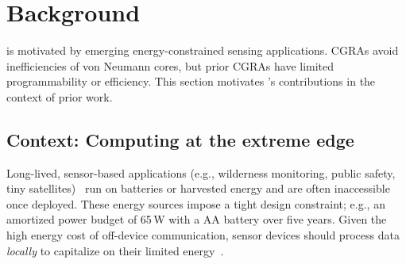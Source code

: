 \section{Background}
\label{riptide:background}

\tabRipTideSnippets

\riptide is motivated by emerging energy-constrained sensing applications.
%
CGRAs avoid inefficiencies of von Neumann cores,
but prior CGRAs have limited programmability or efficiency.
%
This section motivates \riptide's contributions in the context of prior work.

\subsection{Context: Computing at the extreme edge}

Long-lived, sensor-based applications (e.g., wilderness monitoring, public safety, tiny
satellites)~\cite{snapl2017,denby2020orbital} run on batteries or harvested
energy and are often inaccessible once deployed.
%
These energy sources impose a tight design constraint;
e.g., an amortized power budget of 65\,\textmu W with a AA battery
over five years.   
%
Given the high energy cost of off-device communication,
sensor devices should process data \emph{locally} to capitalize
on their limited energy~\cite{sonic}.
%
%
%
%
%
%
%

